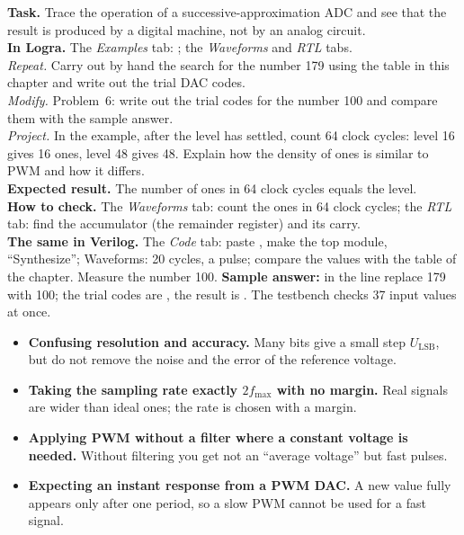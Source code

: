 \begin{diybox}
\textbf{Task.} Trace the operation of a successive-approximation ADC and
see that the result is produced by a digital machine, not by an analog circuit.\\
\textbf{In Logra.} The \emph{Examples} tab: ;
the \emph{Waveforms} and \emph{RTL} tabs.\\
 \emph{Repeat.} Carry out by hand the search for the number 179 using the table in this chapter
and write out the trial DAC codes.\\
 \emph{Modify.} Problem~6: write out the trial codes for the number 100 and
compare them with the sample answer.\\
 \emph{Project.} In the  example, after the level has settled,
count 64 clock cycles: level 16 gives 16 ones, level 48 gives 48.
Explain how the density of ones is similar to PWM and how it differs.\\
\textbf{Expected result.} The number of ones in 64 clock cycles equals the level.\\
\textbf{How to check.} The \emph{Waveforms} tab: count the ones in 64 clock cycles;
the \emph{RTL} tab: find the accumulator (the remainder register) and its carry.\\
\textbf{The same in Verilog.} The \emph{Code} tab: paste , make
 the top module, ``Synthesize''; Waveforms: 20 cycles, a
 pulse; compare the  values with the table of the chapter.
 Measure the number 100. \textbf{Sample answer:} in the line
 replace 179 with 100; the trial codes are
, the result is .
The testbench  checks 37 input values at once.
\end{diybox}

\begin{warnbox}
\begin{itemize}
  \item \textbf{Confusing resolution and accuracy.} Many bits give a small step
        $U_\text{LSB}$, but do not remove the noise and the error of the reference voltage.
  \item \textbf{Taking the sampling rate exactly $2f_\text{max}$ with no margin.}
        Real signals are wider than ideal ones; the rate is chosen with a margin.
  \item \textbf{Applying PWM without a filter where a constant
        voltage is needed.} Without filtering you get not an ``average voltage'' but
        fast pulses.
  \item \textbf{Expecting an instant response from a PWM DAC.} A new value
        fully appears only after one period, so a slow PWM cannot be
        used for a fast signal.
\end{itemize}
\end{warnbox}

